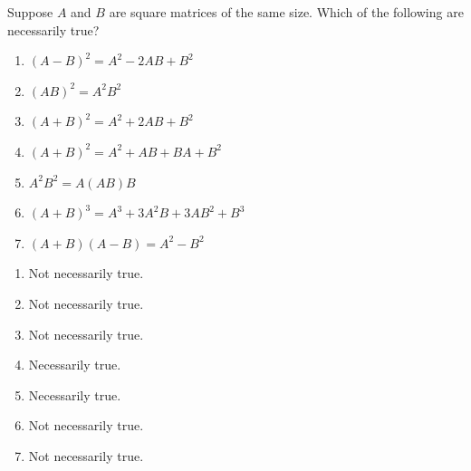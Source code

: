 \begin{enumialphparenastyle}

\begin{ex}
 Suppose $A$ and $B$ are square matrices of the same size. Which of the
following are necessarily true? 

\begin{enumerate}
\item $\left( A-B\right) ^{2}=A^{2}-2AB+B^{2}$ \

\item $\left( AB\right) ^{2}=A^{2}B^{2}$ \

\item $\left( A+B\right) ^{2}=A^{2}+2AB+B^{2}$ \

\item $\left( A+B\right) ^{2}=A^{2}+AB+BA+B^{2}$ \

\item $A^{2}B^{2}=A\left( AB\right) B$ \

\item $\left( A+B\right) ^{3}=A^{3}+3A^{2}B+3AB^{2}+B^{3}$ \

\item $\left( A+B\right) \left( A-B\right) =A^{2}-B^{2}$ \
\end{enumerate}

\begin{sol}
\begin{enumerate}
\item Not necessarily true.  
\item Not necessarily true.
\item Not necessarily true.
\item Necessarily true.
\item Necessarily true.
\item Not necessarily true.
\item Not necessarily true. 
\end{enumerate}
\end{sol}
\end{ex}

\end{enumialphparenastyle}